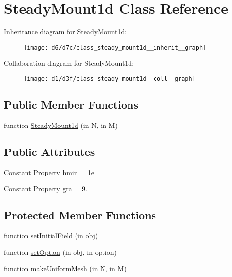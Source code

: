 \hypertarget{class_steady_mount1d}{}\section{Steady\+Mount1d Class Reference}
\label{class_steady_mount1d}


Inheritance diagram for Steady\+Mount1d\+:
\nopagebreak
\begin{figure}[H]
\begin{center}
\leavevmode
\texttt{[image: d6/d7c/class\_steady\_mount1d\_\_inherit\_\_graph]}
\end{center}
\end{figure}


Collaboration diagram for Steady\+Mount1d\+:
\nopagebreak
\begin{figure}[H]
\begin{center}
\leavevmode
\texttt{[image: d1/d3f/class\_steady\_mount1d\_\_coll\_\_graph]}
\end{center}
\end{figure}
\subsection*{Public Member Functions}
\begin{DoxyCompactItemize}
\item 
function \hyperlink{class_steady_mount1d_a28d74905b9e9c39888ee8ded0a716c85}{Steady\+Mount1d} (in N, in M)
\end{DoxyCompactItemize}
\subsection*{Public Attributes}
\begin{DoxyCompactItemize}
\item 
Constant Property \hyperlink{class_steady_mount1d_a15f5335472f5014341baaf4e5be04135}{hmin} = 1e
\item 
Constant Property \hyperlink{class_steady_mount1d_a5a436fd6b496888b3797cfb316f076a0}{gra} = 9.
\end{DoxyCompactItemize}
\subsection*{Protected Member Functions}
\begin{DoxyCompactItemize}
\item 
function \hyperlink{class_steady_mount1d_a03606a12334e24880a8335969fb85852}{set\+Initial\+Field} (in obj)
\item 
function \hyperlink{class_steady_mount1d_a515dce1f4f673837b21f80be1e1715b0}{set\+Option} (in obj, in option)
\item 
function \hyperlink{class_steady_mount1d_a435fab769647f0463f5b157ecff0e6b8}{make\+Uniform\+Mesh} (in N, in M)
\end{DoxyCompactItemize}


